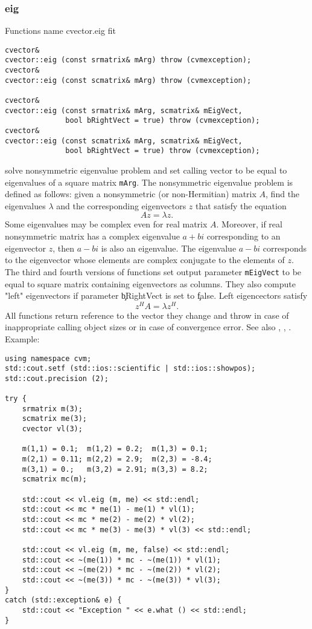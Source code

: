 \subsubsection{eig}
Functions%
\pdfdest name {cvector.eig} fit
\begin{verbatim}
cvector&
cvector::eig (const srmatrix& mArg) throw (cvmexception);
cvector&
cvector::eig (const scmatrix& mArg) throw (cvmexception);

cvector&
cvector::eig (const srmatrix& mArg, scmatrix& mEigVect, 
              bool bRightVect = true) throw (cvmexception);
cvector&
cvector::eig (const scmatrix& mArg, scmatrix& mEigVect,
              bool bRightVect = true) throw (cvmexception);
\end{verbatim}
solve  nonsymmetric eigenvalue problem and
set  calling vector to be equal to eigenvalues
of a square matrix \verb"mArg".
The nonsymmetric eigenvalue problem is defined
as follows: given a nonsymmetric
(or non-Hermitian) matrix $A$, find the eigenvalues $\lambda$
and the corresponding
eigenvectors $z$ that satisfy the equation
\begin{equation*}
Az = \lambda z.
\end{equation*}
Some eigenvalues may be complex even for real matrix $A$.
Moreover, if real nonsymmetric matrix has a complex eigenvalue $a+bi$
corresponding to an eigenvector $z$, then $a-bi$ is also an eigenvalue.
The eigenvalue $a-bi$ corresponds to the eigenvector whose elements
are complex conjugate to the elements of $z$.
The third and fourth versions of  functions
set output parameter \verb"mEigVect" to be equal
to  square matrix containing eigenvectors as columns.
They also compute "left" eigenvectors if parameter \c bRightVect is set to \c false.
Left eigencectors satisfy
\begin{equation*}
z^HA = \lambda z^H.
\end{equation*}
All functions
return  reference to the vector they change and throw
in case of inappropriate calling object sizes
or in case of convergence error.
See also
, ,
.
Example:
\begin{Verbatim}
using namespace cvm;
std::cout.setf (std::ios::scientific | std::ios::showpos);
std::cout.precision (2);

try {
    srmatrix m(3);
    scmatrix me(3);
    cvector vl(3);

    m(1,1) = 0.1;  m(1,2) = 0.2;  m(1,3) = 0.1;
    m(2,1) = 0.11; m(2,2) = 2.9;  m(2,3) = -8.4;
    m(3,1) = 0.;   m(3,2) = 2.91; m(3,3) = 8.2;
    scmatrix mc(m);

    std::cout << vl.eig (m, me) << std::endl;
    std::cout << mc * me(1) - me(1) * vl(1);
    std::cout << mc * me(2) - me(2) * vl(2);
    std::cout << mc * me(3) - me(3) * vl(3) << std::endl;

    std::cout << vl.eig (m, me, false) << std::endl;
    std::cout << ~(me(1)) * mc - ~(me(1)) * vl(1);
    std::cout << ~(me(2)) * mc - ~(me(2)) * vl(2);
    std::cout << ~(me(3)) * mc - ~(me(3)) * vl(3);
}
catch (std::exception& e) {
    std::cout << "Exception " << e.what () << std::endl;
}
\end{Verbatim}
